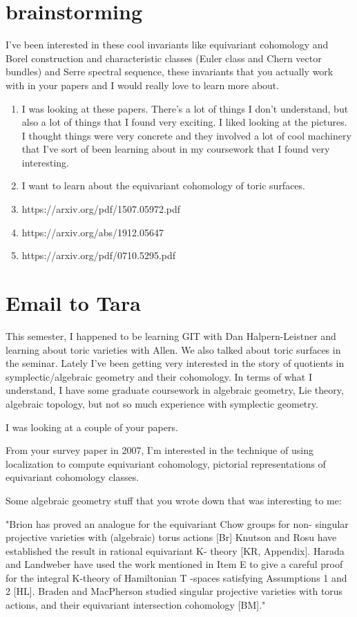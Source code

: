 \documentclass[12pt]{article}
\begin{document}
\section{brainstorming}
I've been interested in these cool invariants like equivariant cohomology and Borel construction and characteristic classes (Euler class and Chern vector bundles) and Serre spectral sequence, these invariants that you actually work with in your papers and I would really love to learn more about.
\begin{enumerate}
    \item I was looking at these papers. There's a lot of things I don't understand, but also a lot of things that I found very exciting. I liked looking at the pictures. I thought things were very concrete and they involved a lot of cool machinery that I've sort of been learning about in my coursework that I found very interesting.
    \item I want to learn about the equivariant cohomology of toric surfaces.
    \item https://arxiv.org/pdf/1507.05972.pdf
    \item https://arxiv.org/abs/1912.05647 
    \item https://arxiv.org/pdf/0710.5295.pdf
\end{enumerate}

\section{Email to Tara}
This semester, I happened to be learning GIT with Dan Halpern-Leistner and learning about toric varieties with Allen. We also talked about toric surfaces in the seminar. Lately I've been getting very interested in the story of quotients in symplectic/algebraic geometry and their cohomology. In terms of what I understand, I have some graduate coursework in algebraic geometry, Lie theory, algebraic topology, but not so much experience with symplectic geometry.

I was looking at a couple of your papers. 

From your survey paper in 2007, I'm interested in the technique of using localization to compute equivariant cohomology, pictorial representations of equivariant cohomology classes.

Some algebraic geometry stuff that you wrote down that was interesting to me:

"Brion has proved an analogue for the equivariant Chow groups for non- singular projective varieties with (algebraic) torus actions [Br] Knutson and Rosu have established the result in rational equivariant K- theory [KR, Appendix]. Harada and Landweber have used the work mentioned in Item E to give a careful proof for the integral K-theory of Hamiltonian T -spaces satisfying Assumptions 1 and 2 [HL]. Braden and MacPherson studied singular projective varieties with torus actions, and their equivariant intersection cohomology [BM]."
\end{document}
